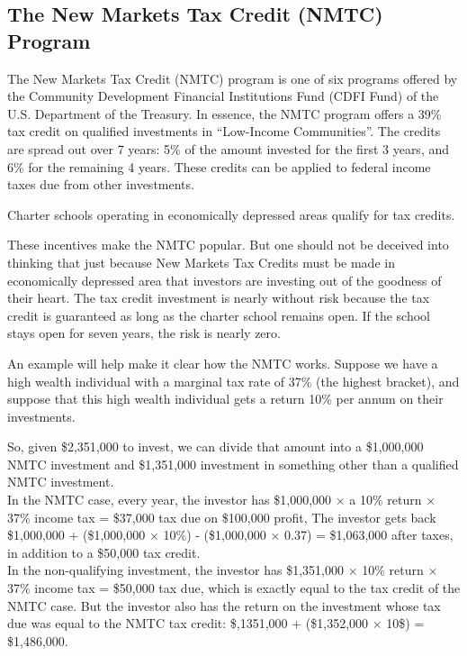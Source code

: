 \subsection{The New Markets Tax Credit (NMTC) Program}\indent%
\label{sec:NMTC}

The New Markets Tax Credit (NMTC) program is one of six programs offered by the Community Development Financial Institutions Fund (CDFI Fund) of the U.S. Department of the Treasury. In essence, the NMTC program offers a 39\% tax credit on qualified investments in ``Low-Income Communities''. The credits are spread out over 7 years: 5\% of the amount invested for the first 3 years, and 6\% for the remaining 4 years. These credits can be applied to federal income taxes due from other investments. 

Charter schools operating in economically depressed areas qualify for tax credits. 

These incentives make the NMTC popular. But one should not be deceived into thinking that just because New Markets Tax Credits must be made in economically depressed area that investors are investing out of the goodness of their heart. The tax credit investment is nearly without risk because the tax credit is guaranteed as long as the charter school remains open. If the school stays open for seven years, the risk is nearly zero.

An example will help make it clear how the NMTC works. Suppose we have a high wealth individual with a marginal tax rate of 37\% (the highest bracket), and suppose that this high wealth individual gets a return 10\% per annum on their investments.

So, given \$2,351,000 to invest, we can divide that amount into a \$1,000,000 NMTC investment and \$1,351,000 investment in something other than a qualified NMTC investment. \\

In the NMTC case, every year, the investor has \$1,000,000 $\times$ a 10\% return $\times$ 37\% income tax = \$37,000 tax due on \$100,000 profit, The investor gets back \$1,000,000 + (\$1,000,000 $\times$ 10\%) - (\$1,000,000 $\times$ 0.37) = \$1,063,000 after taxes, in addition to a \$50,000 tax credit. \\
  
In the non-qualifying investment, the investor has \$1,351,000 $\times$ 10\% return $\times$ 37\% income tax = \$50,000 tax due, which is exactly equal to the tax credit of the NMTC case. But the investor also has the return on the investment whose tax due was equal to the NMTC tax credit: \$,1351,000 + (\$1,352,000 $\times$ 10\$) = \$1,486,000.\\

